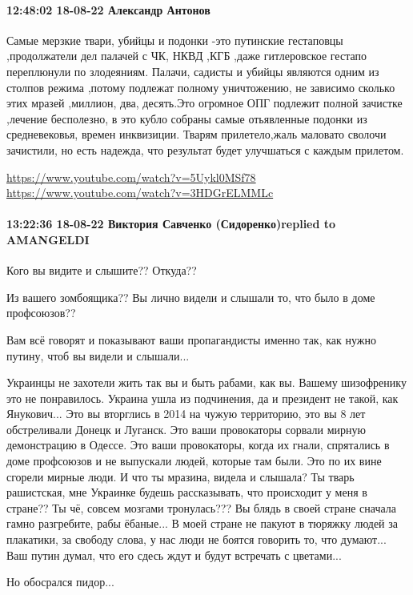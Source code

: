 \paragraph{12:48:02 18-08-22 Александр Антонов}

Самые мерзкие твари, убийцы и подонки -это путинские гестаповцы ,продолжатели
дел палачей с ЧК, НКВД ,КГБ ,даже гитлеровское гестапо переплюнули по
злодеяниям. Палачи, садисты и убийцы являются одним из столпов режима ,потому
подлежат полному уничтожению, не зависимо сколько этих мразей ,миллион, два,
десять.Это огромное ОПГ подлежит полной зачистке ,лечение бесполезно, в это
кубло собраны самые отьявленные подонки из средневековья, времен инквизиции.
Тварям прилетело,жаль маловато сволочи зачистили, но есть надежда, что
результат будет улучшаться с каждым прилетом.

\url{https://www.youtube.com/watch?v=5Uykl0MSf78}
\url{https://www.youtube.com/watch?v=3HDGrELMMLc}

\paragraph{13:22:36 18-08-22 Виктория Савченко (Сидоренко)replied to AMANGELDI}

Кого вы видите и слышите?? Откуда??

Из вашего зомбоящика?? Вы лично видели и слышали то, что было в доме
профсоюзов??

Вам всё говорят и показывают ваши пропагандисты именно так, как нужно путину,
чтоб вы видели и слышали...

Украинцы не захотели жить так вы и быть рабами, как вы. Вашему шизофренику это
не понравилось. Украина ушла из подчинения, да и президент не такой, как
Янукович... Это вы вторглись в 2014 на чужую территорию, это вы 8 лет
обстреливали Донецк и Луганск. Это ваши провокаторы сорвали мирную демонстрацию
в Одессе. Это ваши провокаторы, когда их гнали, спрятались в доме профсоюзов и
не выпускали людей, которые там были. Это по их вине сгорели мирные люди. И что
ты мразина, видела и слышала? Ты тварь рашистская, мне Украинке будешь
рассказывать, что происходит у меня в стране?? Ты чё, совсем мозгами
тронулась??? Вы блядь в своей стране сначала гамно разгребите, рабы ёбаные... В
моей стране не пакуют в тюряжку людей за плакатики, за свободу слова, у нас
люди не боятся говорить то, что думают... Ваш путин думал, что его сдесь ждут и
будут встречать с цветами...

Но обосрался пидор...


